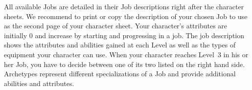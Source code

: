 All available Jobs are detailed in their Job descriptions right after the character sheets.
We recommend to print or copy the description of your chosen Job to use as the second page of your character sheet.
Your character's attributes are initially 0 and increase by starting and progressing in a job.
The job description shows the attributes and abilities gained at each Level as well as the types of equipment your character can use.
When your character reaches Level~3 in his or her Job, you have to decide between one of its two  listed on the right hand side. 
Archetypes represent different specializations of a Job and provide additional abilities and attributes.
%
\clearpage
